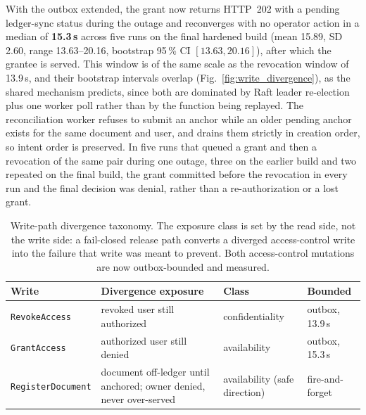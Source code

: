 \documentclass[preprint,12pt]{elsarticle}
\begin{document}
With the outbox extended, the grant now returns HTTP~202 with a pending
ledger-sync status during the outage and reconverges with no operator action in a
median of \textbf{15.3\,s} across five runs on the final hardened build (mean
15.89, SD 2.60, range 13.63--20.16, bootstrap 95\,\% CI $[13.63, 20.16]$),
after which the grantee is served. This window is of the same scale as the
revocation window of 13.9\,s, and their bootstrap intervals overlap
(Fig.~\ref{fig:write_divergence}), as the shared mechanism predicts, since
both are dominated by Raft leader re-election plus one worker poll rather than
by the function being replayed. The reconciliation worker refuses to submit an
anchor while an older pending anchor exists for the same document and user, and
drains them strictly in creation order, so intent order is preserved. In five
runs that queued a grant and then a revocation of the same pair during one
outage, three on the earlier build and two repeated on the final build, the
grant committed before the revocation in every run and the final decision was
denial, rather than a re-authorization or a lost grant.

\begin{table}[!t]
\centering
\caption{Write-path divergence taxonomy. The exposure class is set by the read
side, not the write side: a fail-closed release path converts a diverged
access-control write into the failure that write was meant to prevent. Both
access-control mutations are now outbox-bounded and measured.}
\label{tab:writepaths}
\footnotesize
\setlength{\tabcolsep}{4pt}
\begin{tabular}{@{}>{\raggedright\arraybackslash}p{}%
                 >{\raggedright\arraybackslash}p{}%
                 >{\raggedright\arraybackslash}p{}%
                 >{\raggedright\arraybackslash}p{}@{}}
\toprule
Write & Divergence exposure & Class & Bounded \\
\midrule
\texttt{Revoke\-Access} & revoked user still authorized & confidentiality &
  outbox, 13.9\,s \\
\texttt{Grant\-Access} & authorized user still denied & availability &
  outbox, 15.3\,s \\
\texttt{Register\-Document} & document off-ledger until anchored; owner denied,
  never over-served & availability (safe direction) & fire-and-forget \\
\bottomrule
\end{tabular}
\end{table}
\end{document}

